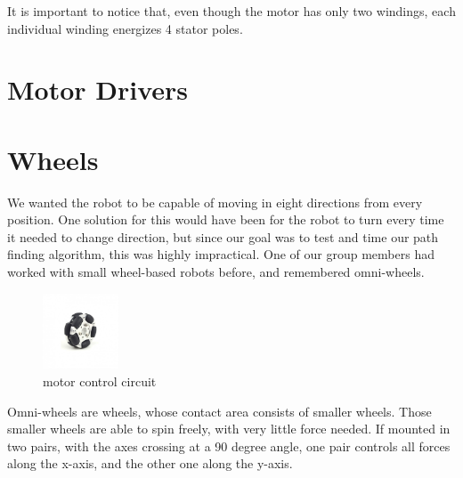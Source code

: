 \begin{figure}[htp] 
    \centering
    \hfill
\end{figure}

It is important to notice that, even though the motor has only two windings, each individual winding energizes 4 stator poles.

\section{Motor Drivers}\label{sec:drivers}
\section{Wheels}\label{sec:wheels}
We wanted the robot to be capable of moving in eight directions from every position.
One solution for this would have been for the robot to turn every time it needed to change direction,
but since our goal was to test and time our path finding algorithm,
this was highly impractical.
One of our group members had worked with small wheel-based robots before,
and remembered omni-wheels.
\begin{figure}[htp]
	\centering
	\includegraphics[width=0.2\textwidth]{figures/move/omni_wheel}
	\caption{motor control circuit}
	\label{fig:omni}
\end{figure}
Omni-wheels are wheels,
whose contact area consists of smaller wheels.
Those smaller wheels are able to spin freely,
with very little force needed.
If mounted in two pairs,
with the axes crossing at a 90 degree angle, 
one pair controls all forces along the x-axis,
and the other one along the y-axis.

